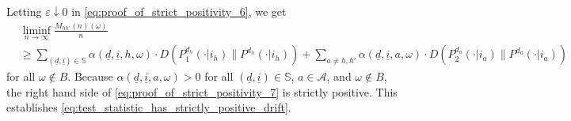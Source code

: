 Letting $\varepsilon\downarrow 0$ in \eqref{eq:proof_of_strict_positivity_6}, we get
\begin{align}
	&\liminf\limits_{n\to\infty}\frac{M_{hh'}(n)( \omega)}{n}\nonumber\\
	&\geq
\sum\limits_{(\underline{d}, \underline{i})\in \mathbb{S}}\alpha(\underline{d}, \underline{i}, h, \omega)\cdot  D(P_1^{d_h}(\cdot|i_h) \| P^{d_h}(\cdot|i_h)) + \sum\limits_{a\neq h, h'} \alpha(\underline{d}, \underline{i}, a, \omega) \cdot D(P_2^{d_a}(\cdot|i_a) \| P^{d_a}(\cdot|i_a))
\label{eq:proof_of_strict_positivity_7}
\end{align}
for all $\omega \notin B$.
Because $\alpha(\underline{d}, \underline{i}, a, \omega)>0$ for all $(\underline{d}, \underline{i})\in \mathbb{S}$, $a\in \mathcal{A}$, and $\omega \notin B$, the right hand side of \eqref{eq:proof_of_strict_positivity_7} is strictly positive. This establishes \eqref{eq:test_statistic_has_strictly_positive_drift}.

